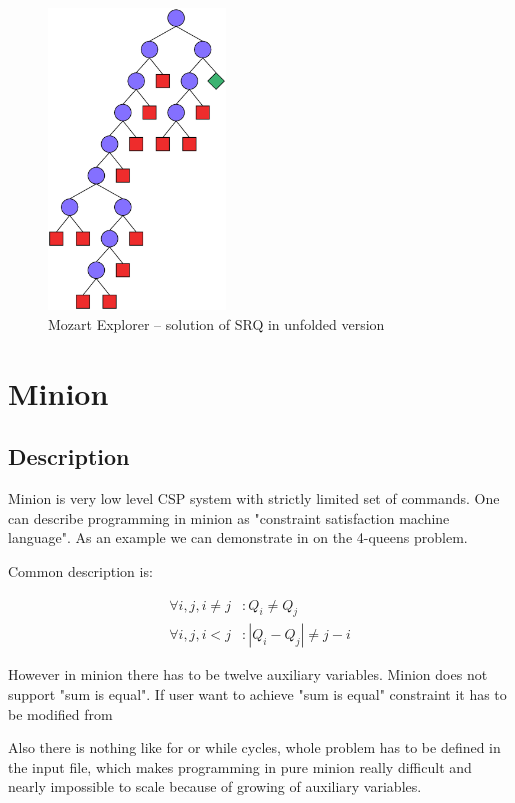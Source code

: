 \begin{figure}
\caption{\label{srq-mozart-unfolded}Mozart Explorer -- solution of SRQ in unfolded version}
\begin{center}
\includegraphics[height=8cm]{images/mozart/srq.oz.color.unfolded.eps}
\end{center}
\end{figure}


\section{Minion}

\subsection{Description}

Minion is very low level CSP system with strictly limited set of commands. One 
can describe programming in minion as "constraint satisfaction machine language".
As an example we can demonstrate in on the 4-queens problem.

Common description is:

\begin{align}
\forall i,j, i \neq j & : Q_i \neq Q_j \\
\forall i,j, i < j & : | Q_i - Q_j | \neq j - i 
\end{align}

However in minion there has to be twelve auxiliary variables. Minion does not 
support "sum is equal". If user want to achieve "sum is equal" constraint it has 
to be modified from


Also there is nothing like for or while cycles, whole problem has to be defined in
the input file, which makes programming in pure minion really difficult and nearly
impossible to scale because of growing of auxiliary variables.

